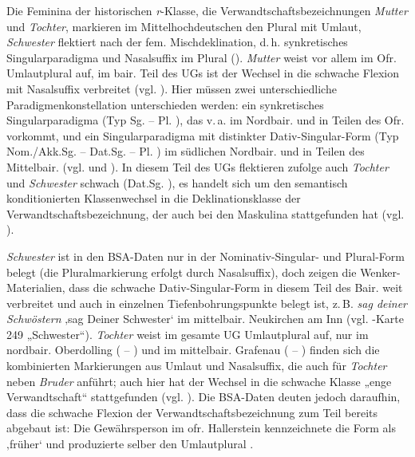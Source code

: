 Die Feminina der historischen \textit{r}-Klasse, die Verwandtschaftsbezeichnungen \textit{Mutter} und \textit{Tochter}, markieren im Mittelhochdeutschen den Plural mit Umlaut, \textit{Schwester} flektiert nach der fem. Mischdeklination, d.\,h. synkretisches Singularparadigma und Nasalsuffix im Plural (\citealt[§43]{Paul1968}). \textit{Mutter} weist vor allem im Ofr. Umlautplural auf, im bair. Teil des UGs ist der Wechsel in die schwache Flexion mit Nasalsuffix verbreitet (vgl. \citealt[Karte 131]{SNiB7}). Hier müssen zwei unterschiedliche Paradigmenkonstellation unterschieden werden: ein synkretisches Singularparadigma (Typ Sg.  -- Pl. ), das v.\,a. im Nordbair. und in Teilen des Ofr. vorkommt, und ein Singularparadigma mit distinkter Dativ-Singular-Form (Typ Nom./Akk.Sg.  -- Dat.Sg.  -- Pl. ) im südlichen Nordbair. und in Teilen des Mittelbair. (vgl.  und ). In diesem Teil des UGs flektieren \citet[137]{Rowley1997} zufolge auch \textit{Tochter} und \textit{Schwester} schwach (Dat.Sg. ), es handelt sich um den semantisch konditionierten Klassenwechsel in die Deklinationsklasse der Verwandtschaftsbezeichnung, der auch bei den Maskulina stattgefunden hat (vgl. ).

\textit{Schwester} ist in den BSA-Daten nur in der Nominativ-Singular- und Plural-Form belegt (die Pluralmarkierung erfolgt durch Nasalsuffix), doch zeigen die Wenker-Materialien, dass die schwache Dativ-Singular-Form in diesem Teil des Bair. weit verbreitet und auch in einzelnen Tiefenbohrungspunkte belegt ist, z.\,B. \textit{sag deiner Schwöstern} ‚sag Deiner Schwester‘ im mittelbair. Neukirchen am Inn (vgl. \citealt{WA}-Karte 249 „Schwester“). \textit{Tochter} weist im gesamte UG Umlautplural auf, nur im nordbair. Oberdolling ( -- ) und im mittelbair. Grafenau ( -- ) finden sich die kombinierten Markierungen aus Umlaut und Nasalsuffix, die auch \citet[137]{Rowley1997} für \textit{Tochter} neben \textit{Bruder} anführt; auch hier hat der Wechsel in die schwache Klasse „enge Verwandtschaft“ stattgefunden (vgl. \citealt[Karte 123]{SNiB7}). Die BSA-Daten deuten jedoch daraufhin, dass die schwache Flexion der Verwandtschaftsbezeichnung zum Teil bereits abgebaut ist: Die Gewährsperson im ofr. Hallerstein kennzeichnete die Form   als ‚früher‘ und produzierte selber den Umlautplural .

